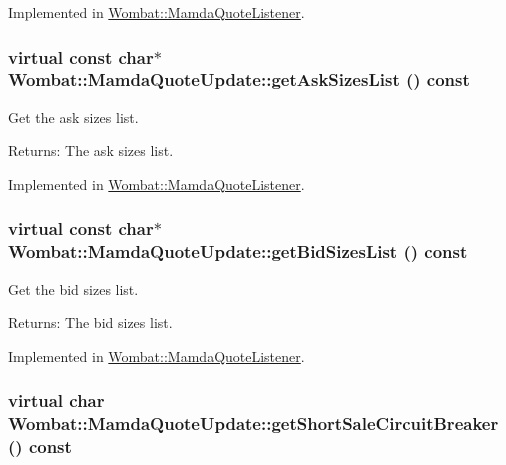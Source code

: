 Implemented in \hyperlink{classWombat_1_1MamdaQuoteListener_17999949e20889d0d319e71874949d25}{Wombat::Mamda\-Quote\-Listener}.\hypertarget{classWombat_1_1MamdaQuoteUpdate_05320bcb2d86d1b56d023fe36d642605}{
\subsubsection[getAskSizesList]{\setlength{\rightskip}{0pt plus 5cm}virtual const char$\ast$ Wombat::Mamda\-Quote\-Update::get\-Ask\-Sizes\-List () const}}
\label{classWombat_1_1MamdaQuoteUpdate_05320bcb2d86d1b56d023fe36d642605}


Get the ask sizes list. 

\begin{Desc}
\item[Returns:]The ask sizes list. \end{Desc}


Implemented in \hyperlink{classWombat_1_1MamdaQuoteListener_9aa5070318fdfb0cc239fb6f11e286c0}{Wombat::Mamda\-Quote\-Listener}.\hypertarget{classWombat_1_1MamdaQuoteUpdate_5bf842d9bbf0ee4fba7add0e3fd14254}{
\subsubsection[getBidSizesList]{\setlength{\rightskip}{0pt plus 5cm}virtual const char$\ast$ Wombat::Mamda\-Quote\-Update::get\-Bid\-Sizes\-List () const}}
\label{classWombat_1_1MamdaQuoteUpdate_5bf842d9bbf0ee4fba7add0e3fd14254}


Get the bid sizes list. 

\begin{Desc}
\item[Returns:]The bid sizes list. \end{Desc}


Implemented in \hyperlink{classWombat_1_1MamdaQuoteListener_93be6aa13008fc17858aafac4d212eb5}{Wombat::Mamda\-Quote\-Listener}.\hypertarget{classWombat_1_1MamdaQuoteUpdate_1bbdca5731cb0581db95e8b07d7cb81a}{
\subsubsection[getShortSaleCircuitBreaker]{\setlength{\rightskip}{0pt plus 5cm}virtual char Wombat::Mamda\-Quote\-Update::get\-Short\-Sale\-Circuit\-Breaker () const}}
\label{classWombat_1_1MamdaQuoteUpdate_1bbdca5731cb0581db95e8b07d7cb81a}


